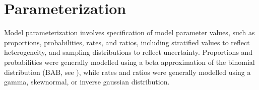 \section{Parameterization}\label{model.par}
Model parameterization involves
specification of model parameter values, such as proportions, probabilities, rates, and ratios,
including stratified values to reflect heterogeneity,
and sampling distributions to reflect uncertainty.
Proportions and probabilities were generally modelled using
a beta approximation of the binomial distribution (BAB, see ),
while rates and ratios were generally modelled using
a gamma, skewnormal, or inverse gaussian distribution.








